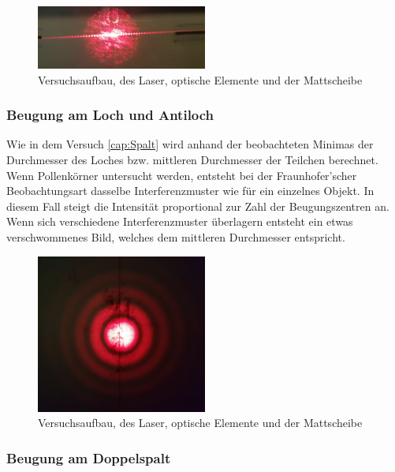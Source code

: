 \begin{figure}[h!]
	\centering
	\includegraphics[width=0.5\textwidth]{data/versuch_spalt}
	\caption{Versuchsaufbau, des Laser, optische Elemente und der Mattscheibe}
	\label{fig:Versuchsaufbau}
\end{figure}

\subsubsection{Beugung am Loch und Antiloch}
Wie in dem Versuch \ref{cap:Spalt} wird anhand der beobachteten Minimas der Durchmesser des Loches bzw. mittleren Durchmesser der Teilchen berechnet. Wenn Pollenkörner untersucht werden, entsteht bei der Fraunhofer'scher Beobachtungsart dasselbe Interferenzmuster wie für ein einzelnes Objekt. In diesem Fall steigt die Intensität proportional zur Zahl der Beugungszentren an. Wenn sich verschiedene Interferenzmuster überlagern entsteht ein etwas verschwommenes Bild, welches dem mittleren Durchmesser entspricht.

\begin{figure}[h!]
	\centering
	\includegraphics[width=0.5\textwidth]{data/versuch_loch}
	\caption{Versuchsaufbau, des Laser, optische Elemente und der Mattscheibe}
	\label{fig:Versuchsaufbau}
\end{figure}

\subsubsection{Beugung am Doppelspalt}

